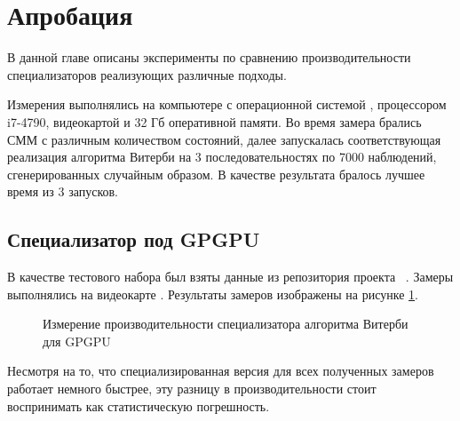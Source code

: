 \section{Апробация}
В данной главе описаны эксперименты по сравнению 
производительности специализаторов реализующих различные 
подходы.

Измерения выполнялись на компьютере с операционной системой 
, процессором  i7-4790, 
видеокартой  и 32 Гб 
оперативной памяти.
Во время замера брались СММ с различным количеством 
состояний, далее запускалась соответствующая реализация 
алгоритма Витерби на 3 последовательностях по 7000 
наблюдений, сгенерированных случайным образом.
В качестве результата бралось лучшее время из 3 
запусков.

\subsection{Специализатор под GPGPU}
В качестве тестового набора был взяты данные из репозитория  
проекта ~\cite{cudampf}.
Замеры выполнялись на видеокарте .
Результаты замеров изображены на рисунке \ref{GPU_bench}.
\begin{figure}[h]
\centering
\caption{Измерение производительности специализатора алгоритма Витерби для GPGPU}
\label{GPU_bench}
\end{figure}

Несмотря на то, что специализированная версия для всех 
полученных замеров работает немного быстрее, эту разницу в 
производительности стоит воспринимать как статистическую 
погрешность.

